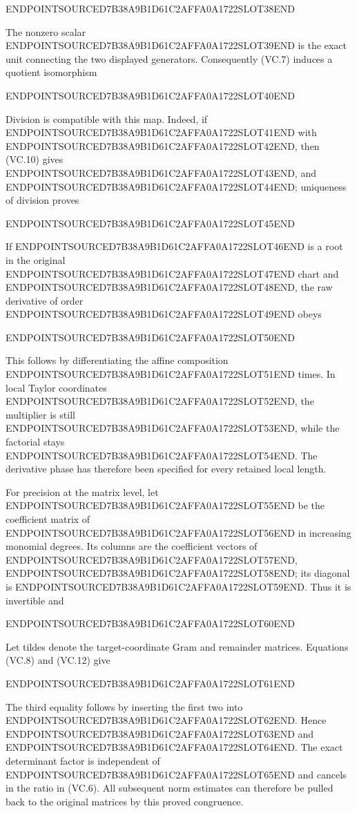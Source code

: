 ENDPOINTSOURCED7B38A9B1D61C2AFFA0A1722SLOT38END

The nonzero scalar ENDPOINTSOURCED7B38A9B1D61C2AFFA0A1722SLOT39END is the exact unit connecting the two displayed generators. Consequently (VC.7) induces a quotient isomorphism

ENDPOINTSOURCED7B38A9B1D61C2AFFA0A1722SLOT40END

Division is compatible with this map. Indeed, if ENDPOINTSOURCED7B38A9B1D61C2AFFA0A1722SLOT41END with ENDPOINTSOURCED7B38A9B1D61C2AFFA0A1722SLOT42END, then (VC.10) gives ENDPOINTSOURCED7B38A9B1D61C2AFFA0A1722SLOT43END, and ENDPOINTSOURCED7B38A9B1D61C2AFFA0A1722SLOT44END; uniqueness of division proves

ENDPOINTSOURCED7B38A9B1D61C2AFFA0A1722SLOT45END

If ENDPOINTSOURCED7B38A9B1D61C2AFFA0A1722SLOT46END is a root in the original ENDPOINTSOURCED7B38A9B1D61C2AFFA0A1722SLOT47END chart and ENDPOINTSOURCED7B38A9B1D61C2AFFA0A1722SLOT48END, the raw derivative of order ENDPOINTSOURCED7B38A9B1D61C2AFFA0A1722SLOT49END obeys

ENDPOINTSOURCED7B38A9B1D61C2AFFA0A1722SLOT50END

This follows by differentiating the affine composition ENDPOINTSOURCED7B38A9B1D61C2AFFA0A1722SLOT51END times. In local Taylor coordinates ENDPOINTSOURCED7B38A9B1D61C2AFFA0A1722SLOT52END, the multiplier is still ENDPOINTSOURCED7B38A9B1D61C2AFFA0A1722SLOT53END, while the factorial stays ENDPOINTSOURCED7B38A9B1D61C2AFFA0A1722SLOT54END. The derivative phase has therefore been specified for every retained local length.

For precision at the matrix level, let ENDPOINTSOURCED7B38A9B1D61C2AFFA0A1722SLOT55END be the coefficient matrix of ENDPOINTSOURCED7B38A9B1D61C2AFFA0A1722SLOT56END in increasing monomial degrees. Its columns are the coefficient vectors of ENDPOINTSOURCED7B38A9B1D61C2AFFA0A1722SLOT57END, ENDPOINTSOURCED7B38A9B1D61C2AFFA0A1722SLOT58END; its diagonal is ENDPOINTSOURCED7B38A9B1D61C2AFFA0A1722SLOT59END. Thus it is invertible and

ENDPOINTSOURCED7B38A9B1D61C2AFFA0A1722SLOT60END

Let tildes denote the target-coordinate Gram and remainder matrices. Equations (VC.8) and (VC.12) give

ENDPOINTSOURCED7B38A9B1D61C2AFFA0A1722SLOT61END

The third equality follows by inserting the first two into ENDPOINTSOURCED7B38A9B1D61C2AFFA0A1722SLOT62END. Hence ENDPOINTSOURCED7B38A9B1D61C2AFFA0A1722SLOT63END and ENDPOINTSOURCED7B38A9B1D61C2AFFA0A1722SLOT64END. The exact determinant factor is independent of ENDPOINTSOURCED7B38A9B1D61C2AFFA0A1722SLOT65END and cancels in the ratio in (VC.6). All subsequent norm estimates can therefore be pulled back to the original matrices by this proved congruence.

